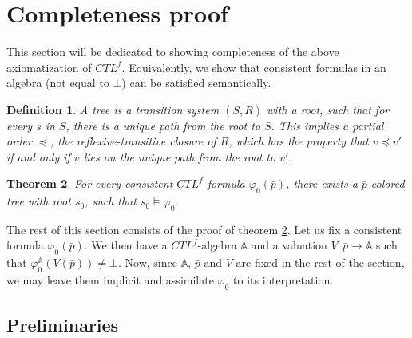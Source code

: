 \documentclass[11pt]{article}
\newcommand{\A}{{\mathbb A}}
\newtheorem{definition}{Definition}[section]
\newtheorem{theorem}[definition]{Theorem}
\begin{document}
\section{Completeness proof}\label{sec:compl}    

This section will be dedicated to showing completeness of the above axiomatization of $CTL^f$. Equivalently, we show that consistent formulas in an algebra (not equal to $\bot$) can be satisfied semantically.

\begin{definition}\label{tree}
    A \emph{tree} is a transition system $(S,R)$ with a \emph{root}, such that for every $s$ in $S$, there is a unique path from the root to $S$. This implies a partial order $\preceq$, the reflexive-transitive closure of $R$, which has the property that $v\preceq v'$ if and only if $v$ lies on the unique path from the root to $v'$.
\end{definition}

\begin{theorem}\label{completeness}
    For every \emph{consistent} $CTL^f$-formula $\varphi_0(\bar{p})$, there exists a $\bar{p}$-colored tree with root $s_0$, such that $s_0 \models \varphi_0$.
\end{theorem}

The rest of this section consists of the proof of theorem \ref{completeness}. Let us fix a consistent formula $\varphi_0({\bar{p}})$. We then have a $CTL^f$-algebra $\A$ and a valuation $V:\bar{p}\to \A$ such that $\varphi_0^\A(V(\bar{p}))\neq\bot$. Now, since $\A$, $\bar{p}$ and $V$ are fixed in the rest of the section, we may leave them implicit and assimilate $\varphi_0$ to its interpretation.

\subsection*{Preliminaries}
\end{document}
